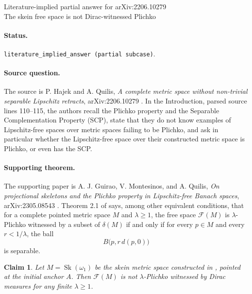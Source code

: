 \documentclass[11pt]{article}
\newtheorem*{claim}{Claim}
\begin{document}
\begin{center}
{\Large Literature-implied partial answer for arXiv:2206.10279}\\[3pt]
{\large The skein free space is not Dirac-witnessed Plichko}
\end{center}

\paragraph{Status.}
\texttt{literature\_implied\_answer (partial subcase)}.

\paragraph{Source question.}
The source is P. Hajek and A. Quilis, \emph{A complete metric space without
non-trivial separable Lipschitz retracts}, arXiv:2206.10279 \cite{HQ22}.
In the Introduction, parsed source lines 110--115, the authors recall the
Plichko property and the Separable Complementation Property (SCP), state that
they do not know examples of Lipschitz-free spaces over metric spaces failing
to be Plichko, and ask in particular whether the Lipschitz-free space over
their constructed metric space is Plichko, or even has the SCP.

\paragraph{Supporting theorem.}
The supporting paper is A. J. Guirao, V. Montesinos, and A. Quilis,
\emph{On projectional skeletons and the Plichko property in Lipschitz-free
Banach spaces}, arXiv:2305.08543 \cite{GMQ23}.  Theorem 2.1 of
\cite{GMQ23} says, among other equivalent conditions, that for a complete
pointed metric space \(M\) and \(\lambda\geq 1\), the free space
\(\mathcal F(M)\) is \(\lambda\)-Plichko witnessed by a subset of
\(\delta(M)\) if and only if for every \(p\in M\) and every
\(r<1/\lambda\), the ball
\[
        B\bigl(p,r\,d(p,0)\bigr)
\]
is separable.

\begin{claim}
Let \(M=\operatorname{Sk}(\omega_1)\) be the skein metric space constructed in
\cite{HQ22}, pointed at the initial anchor \(A\).  Then \(\mathcal F(M)\) is
not \(\lambda\)-Plichko witnessed by Dirac measures for any finite
\(\lambda\geq 1\).
\end{claim}
\end{document}
